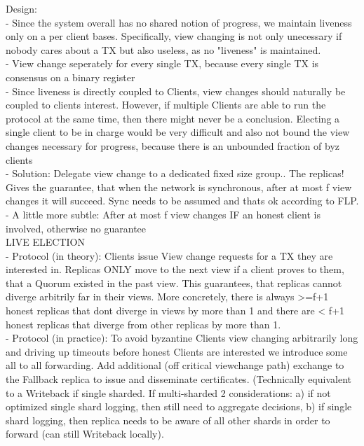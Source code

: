 Design: \\
- Since the system overall has no shared notion of progress, we maintain liveness only on a per client bases. Specifically, view changing is not only unecessary if nobody cares about a TX but also useless, as no "liveness" is maintained.\\
- View change seperately for every single TX, because every single TX is consensus on a binary register\\
- Since liveness is directly coupled to Clients, view changes should naturally be coupled to clients interest. However, if multiple Clients are able to run the protocol at the same time, then there might never be a conclusion. Electing a single client to be in charge would be very difficult and also not bound the view changes necessary for progress, because there is an unbounded fraction of byz clients\\
- Solution: Delegate view change to a dedicated fixed size group.. The replicas! Gives the guarantee, that when the network is synchronous, after at most f view changes it will succeed. Sync needs to be assumed and thats ok according to FLP.\\
- A little more subtle: After at most f view changes IF an honest client is involved, otherwise no guarantee\\

LIVE ELECTION\\
- Protocol (in theory): Clients issue View change requests for a TX they are interested in. Replicas ONLY move to the next view if a client proves to them, that a Quorum existed in the past view. This guarantees, that replicas cannot diverge arbitrily far in their views. More concretely, there is always >=f+1 honest replicas that dont diverge in views by more than 1 and there are < f+1 honest replicas that diverge from other replicas by more than 1.\\


- Protocol (in practice): To avoid byzantine Clients view changing arbitrarily long and driving up timeouts before honest Clients are interested we introduce some all to all forwarding.
Add additional (off critical viewchange path) exchange to the Fallback replica to issue and disseminate certificates. (Technically equivalent to a Writeback if single sharded. If multi-sharded 2 considerations: a) if not optimized single shard logging, then still need to aggregate decisions, b) if single shard logging, then replica needs to be aware of all other shards in order to forward (can still Writeback locally).\\

